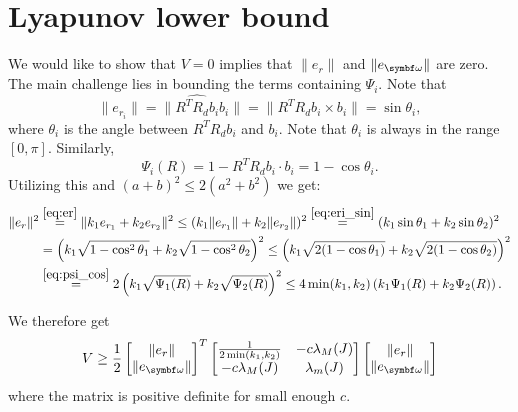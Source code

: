 \section{Lyapunov lower bound}
We would like to show that $V = 0$ implies that $\| e_r \|$ and $\| e_\bomega \|$ are zero. The main challenge lies in bounding the terms containing $\Psi_i$. Note that
\begin{equation}
  \label{eq:eri_sin}
  \|e_{r_i}\| = \|\widehat{R^TR_d b_i} b_i\| = \|R^TR_d b_i \times b_i\| = \sin \theta_i,
\end{equation}
where $\theta_i$ is the angle between $R^TR_d b_i$ and $b_i$. Note that $\theta_i$ is always in the range $[0, \pi]$. Similarly,
\begin{equation}
  \label{eq:psi_cos}
  \Psi_i(R) = 1 - R^T R_d b_i \cdot b_i = 1 - \cos \theta_i.
\end{equation}
Utilizing this and $(a+b)^2 \leq 2(a^2 + b^2)$ we get:
\begin{equation*}
  \begin{aligned}
    \| e_r \|^2 & \overset{\eqref{eq:er}}= \| k_1 e_{r_1} + k_2 e_{r_2} \|^2 \leq ( k_1 \| e_{r_1} \| + k_2 \| e_{r_2} \| )^2 \overset{\eqref{eq:eri_sin}}= ( k_1 \sin \theta_1 + k_2 \sin \theta_2 )^2 \\
                & = \left( k_1 \sqrt{1 - \cos^2 \theta_1 } + k_2 \sqrt{1 - \cos^2 \theta_2 } \right)^2 \leq \left( k_1 \sqrt{2(1 - \cos \theta_1)} + k_2 \sqrt{2(1 - \cos \theta_2) } \right)^2         \\
                & \overset{\eqref{eq:psi_cos}}= 2 \left( k_1 \sqrt{\Psi_1(R)} + k_2 \sqrt{\Psi_2(R)} \right)^2 \leq 4 \min(k_1, k_2) \left( k_1\Psi_1(R) + k_2\Psi_2(R) \right).
  \end{aligned}
\end{equation*}
\begin{tcolorbox}
  We therefore get
  \begin{equation}
    V \geq \frac{1}{2} \begin{bmatrix}
      \| e_r \| \\ \| e_\bomega \|
    \end{bmatrix}^T
    \begin{bmatrix}
      \frac{1}{2\min(k_1, k_2)} & -c \lambda_M(J) \\
      -c \lambda_M(J)           & \lambda_m(J)
    \end{bmatrix}
    \begin{bmatrix}
      \| e_r \| \\ \| e_\bomega \|
    \end{bmatrix}
  \end{equation}
  where the matrix is positive definite for small enough $c$.
\end{tcolorbox}

